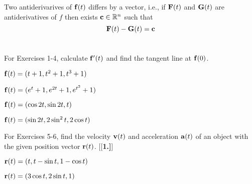 \begin{prop}
 Two antiderivarives of $\mathbf{ f}(t) $ differs by a vector, i.e., if $\mathbf{ F}(t)$ and $\mathbf{ G}(t)$ are antiderivatives of $f$ then exists $\mathbf{ c} \in \mathbb{R}^n$ such that
 \[\mathbf{ F}(t)-\mathbf{ G}(t)=\mathbf{ c}\]
\end{prop}



\section*{}
\begin{multicols}{2}\columnseprule 1pt \columnsep 45pt
\begin{problem}
\par\noindent For Exercises 1-4, calculate $\mathbf{ f}'(t)$ and find the 
tangent line at $\mathbf{ f}(0)$.
\begin{enumerate}[\bfseries 1.]
 \begin{multicols}{2}
  \item $\mathbf{ f}(t) = (t + 1 , t^2 + 1 , t^3 + 1)$
  \item $\mathbf{ f}(t) = (e^t + 1 , e^{2t} + 1 , e^{t^2} + 1)$
 \end{multicols}
 \begin{multicols}{2}
  \item $\mathbf{ f}(t) = (\cos 2t , \sin 2t , t)$
  \item $\mathbf{ f}(t) = (\sin 2t , 2\sin^2 t , 2\cos t)$
 \end{multicols}
\par\noindent For Exercises 5-6, find the velocity $\mathbf{ v}(t)$ and 
acceleration $\mathbf{ a}(t)$ of an object
with the given position vector $\mathbf{ r}(t)$.
[{[\bfseries 1.]}]
 \begin{multicols}{2}
  \item $\mathbf{ r}(t) = (t, t - \sin t , 1 - \cos t)$
  \item $\mathbf{ r}(t) = (3\cos t , 2\sin t , 1)$
 \end{multicols}
\end{enumerate}
\end{problem}
\begin{problem}
\begin{enumerate}



\end{enumerate}
\end{problem}
\end{multicols}
